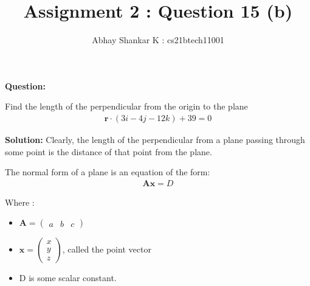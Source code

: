 \documentclass[journal,11pt,twocolumn]{IEEEtran}
\begin{document}
	\title{Assignment 2 : Question 15 (b)}
	\author{ Abhay Shankar K : cs21btech11001}

	\maketitle

	\bigskip

	\providecommand{\brak}[1]{\ensuremath{\left(#1\right)}}
	\providecommand{\abs}[1]{\left\vert#1\right\vert}
	\providecommand{\norm}[1]{\left\lVert#1\right\rVert}
	\newcommand{\solution}{\noindent \textbf{Solution: }}
	\newcommand{\question}{\noindent \textbf{Question: }}

	\newcommand{\myvec}[1]{\ensuremath{\begin{pmatrix}#1\end{pmatrix}}}
	\newcommand{\mydet}[1]{\ensuremath{\begin{vmatrix}#1\end{vmatrix}}}

	\makeatletter
	\makeatother
	\let\StandardTheFigure\thefigure
	\let\vec\mathbf

	\question

	Find the length of the perpendicular from the origin to the plane
	\begin{align} \label{given}
		\vec{r} \cdot \brak{3i - 4j - 12k} + 39 = 0
	\end{align}

	\solution
	Clearly, the length of the perpendicular from a plane passing through some point is the distance of that point from the plane.

	The normal form of a plane is an equation of the form:
	\begin{align}\label{Gen_plane}
		\vec{A}\vec{x} = D
	\end{align}

	Where :
	\begin{itemize}
		\item $\vec{A} = \myvec{a & b & c}$
		\item $\vec{x} = \myvec{x \\ y \\ z}$, called the point vector
		\item D is some scalar constant.
	\end{itemize}
\end{document}
